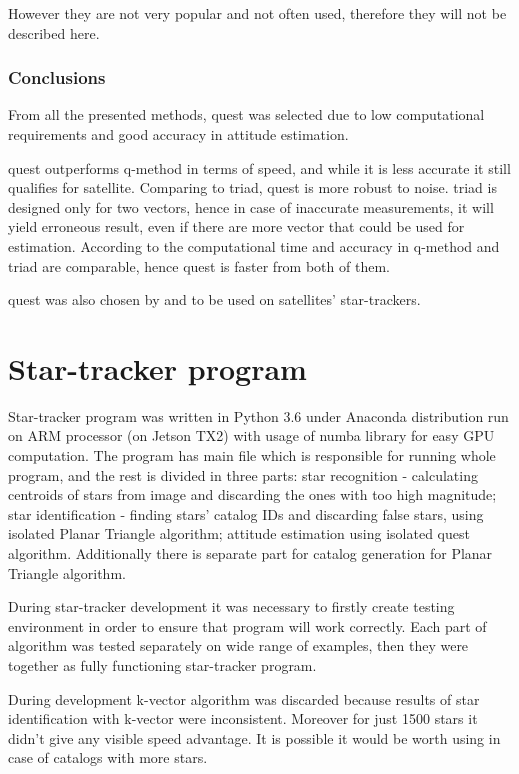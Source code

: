 \documentclass[12pt,a4paper,twoside]{article}
\begin{document}
However they are not very popular and not often used, therefore they will not be described here.

\subsubsection{Conclusions}


From all the presented methods, \gls{quest} was selected due to low computational requirements and good accuracy in attitude estimation.

\gls{quest} outperforms q-method in terms of speed\cite{markley1999estimate}, and while it is less accurate it still qualifies for satellite. Comparing to \gls{triad}, \gls{quest} is more robust to noise. \gls{triad} is designed only for two vectors, hence in case of inaccurate measurements, it will yield erroneous result, even if there are more vector that could be used for estimation. According to \citet{ccelik2013comparison} the computational time and accuracy in q-method and \gls{triad} are comparable, hence \gls{quest} is faster from both of them.

\gls{quest} was also chosen by \citet{huffman2006designing} and \citet{tappe2009development} to be used on satellites' star-trackers.

\newpage
\section{Star-tracker program}

Star-tracker program was written in Python 3.6 under Anaconda distribution run on ARM processor (on Jetson TX2) with usage of numba library for easy GPU computation. The program has main file which is responsible for running whole program, and the rest is divided in three parts: star recognition - calculating centroids of stars from image and discarding the ones with too high magnitude; star identification - finding stars' catalog IDs and discarding false stars, using isolated Planar Triangle algorithm; attitude estimation using isolated \gls{quest} algorithm. Additionally there is separate part for catalog generation for Planar Triangle algorithm.

During star-tracker development it was necessary to firstly create testing environment in order to ensure that program will work correctly. Each part of algorithm was tested separately on wide range of examples, then they were together as fully functioning star-tracker program.

During development k-vector algorithm was discarded because results of star identification with k-vector were inconsistent. Moreover for just 1500 stars it didn't give any visible speed advantage. It is possible it would be worth using in case of catalogs with more stars.
\end{document}
